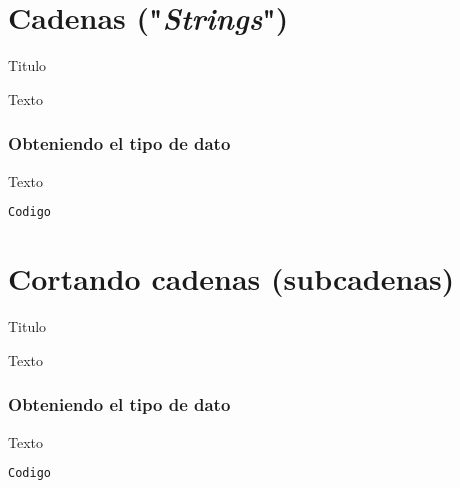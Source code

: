 
\section{Cadenas ("\emph{Strings}")}

\begin{frame}[c]{Titulo}

  Texto

\end{frame}

\begin{frame}[fragile]
  \frametitle{Obteniendo el tipo de dato}

  Texto

  \vspace{\baselineskip}
  \begin{lstlisting}[language=Python]
  Codigo
  \end{lstlisting}
\end{frame}

\section{Cortando cadenas (subcadenas)}

\begin{frame}[c]{Titulo}

  Texto

\end{frame}

\begin{frame}[fragile]
  \frametitle{Obteniendo el tipo de dato}

  Texto

  \vspace{\baselineskip}
  \begin{lstlisting}[language=Python]
  Codigo
  \end{lstlisting}
\end{frame}
